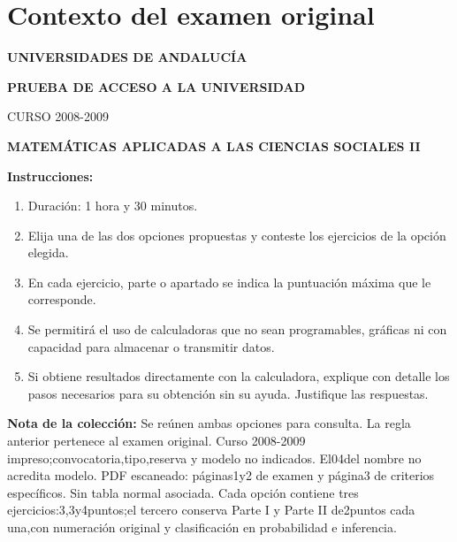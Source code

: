 \section*{Contexto del examen original}
\textbf{UNIVERSIDADES DE ANDALUCÍA}\par
\textbf{PRUEBA DE ACCESO A LA UNIVERSIDAD}\par
CURSO 2008-2009\par
\textbf{MATEMÁTICAS APLICADAS A LAS CIENCIAS SOCIALES II}

\textbf{Instrucciones:}
\begin{enumerate}[label=\textbf{\alph*)}]
  \item Duración: 1 hora y 30 minutos.
  \item Elija una de las dos opciones propuestas y conteste los ejercicios de la opción elegida.
  \item En cada ejercicio, parte o apartado se indica la puntuación máxima que le corresponde.
  \item Se permitirá el uso de calculadoras que no sean programables, gráficas ni con capacidad para almacenar o transmitir datos.
  \item Si obtiene resultados directamente con la calculadora, explique con detalle los pasos necesarios para su obtención sin su ayuda. Justifique las respuestas.
\end{enumerate}
\noindent\textbf{Nota de la colección:} Se reúnen ambas opciones para consulta. La regla anterior pertenece al examen original. Curso 2008-2009 impreso;convocatoria,tipo,reserva y modelo no indicados. El04del nombre no acredita modelo. PDF escaneado: páginas1y2 de examen y página3 de criterios específicos. Sin tabla normal asociada. Cada opción contiene tres ejercicios:3,3y4puntos;el tercero conserva Parte I y Parte II de2puntos cada una,con numeración original y clasificación en probabilidad e inferencia.
\par\medskip
